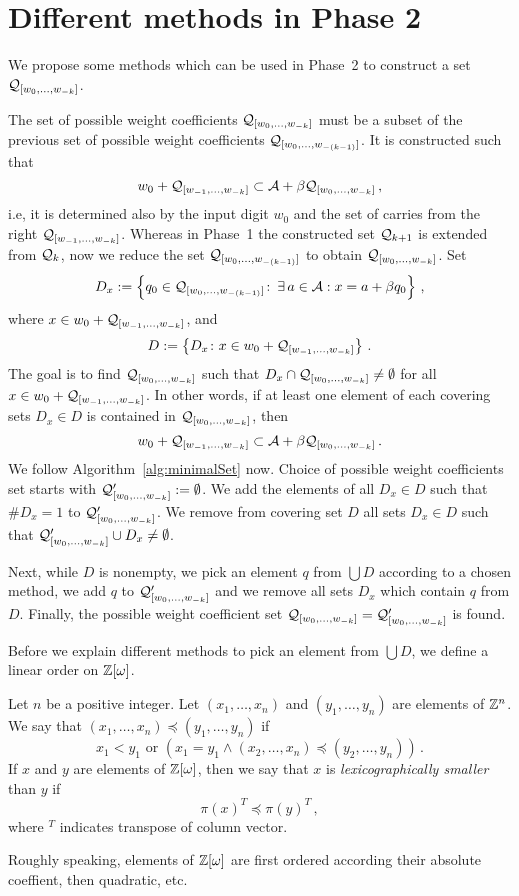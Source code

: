 \section{Different methods in Phase 2}
\label{sec:methodsTwo}
We propose some methods which can be used in Phase~2 to construct a set $\mathcal{Q}_{[w_{0}, \dots, w_{-k}]}$.

The set of possible weight coefficients $\mathcal{Q}_{[w_{0}, \dots, w_{-k}]}$ must be a subset of the previous set of possible weight coefficients $\mathcal{Q}_{[w_{0}, \dots, w_{-(k-1)}]}$. It is constructed such that
$$
 w_0 + \mathcal{Q}_{[w_{-1}, \dots, w_{-k}]} \subset \mathcal{A} + \beta \mathcal{Q}_{[w_{0}, \dots, w_{-k}]}\,,
$$
i.e, it is determined also by the input digit $w_0$ and the set of carries from the right $\mathcal{Q}_{[w_{-1}, \dots, w_{-k}]}$. Whereas in Phase~1 the constructed set $\mathcal{Q}_{k+1}$ is extended from $\mathcal{Q}_k$, now we  reduce the set $\mathcal{Q}_{[w_{0}, \dots, w_{-(k-1)}]}$ to obtain $\mathcal{Q}_{[w_{0}, \dots, w_{-k}]}$. Set 
$$
D_x:= \left\{q_0\in\mathcal{Q}_{[w_{0}, \dots, w_{-(k-1)}]}\colon\, \exists \, a\in\mathcal{A}: x=a+\beta q_0 \right\}\,,
$$
where $x\in w_0 + \mathcal{Q}_{[w_{-1}, \dots, w_{-k}]}$, and 
$$D:=\left\{D_x\colon x\in w_0 + \mathcal{Q}_{[w_{-1}, \dots, w_{-k}]}\right\}\,.$$
 The goal is to find $\mathcal{Q}_{[w_{0}, \dots, w_{-k}]}$ such that $D_x \cap \mathcal{Q}_{[w_{0}, \dots, w_{-k}]} \neq \emptyset$ for all $x\in w_0 + \mathcal{Q}_{[w_{-1}, \dots, w_{-k}]}$. In other words, if at least one element of each covering sets $D_x\in D$ is contained in $\mathcal{Q}_{[w_{0}, \dots, w_{-k}]}$, then 
$$
 w_0 + \mathcal{Q}_{[w_{-1}, \dots, w_{-k}]} \subset \mathcal{A} + \beta \mathcal{Q}_{[w_{0}, \dots, w_{-k}]}\,.
$$
We follow Algorithm~\ref{alg:minimalSet} now. Choice of possible weight coefficients set starts with $\mathcal{Q}_{[w_{0}, \dots, w_{-k}]}':=\emptyset$. We add the elements of all $D_x\in D$ such that $\#D_x=1$ to $\mathcal{Q}_{[w_{0}, \dots, w_{-k}]}'$. We remove from covering set $D$ all sets $D_x\in D$ such that $\mathcal{Q}_{[w_{0}, \dots, w_{-k}]}' \cup D_x \neq \emptyset$. 

Next, while $D$ is nonempty, we pick an element $q$ from $\bigcup D$ according to a chosen method, we add $q$ to $\mathcal{Q}_{[w_{0}, \dots, w_{-k}]}'$ and we remove all sets $D_x$ which contain $q$ from $D$. Finally, the possible weight coefficient set $\mathcal{Q}_{[w_{0}, \dots, w_{-k}]}=\mathcal{Q}_{[w_{0}, \dots, w_{-k}]}'$ is found.

Before we explain different methods  to pick an element from $\bigcup D$, we define a linear order on $\mathbb{Z}[\omega]$.

\begin{defn}
\label{def:lexicographical}
Let $n$ be a positive integer. Let $(x_1, \dots, x_n)$ and $(y_1, \dots, y_n)$ are elements of $\mathbb{Z}^n$. We say that $(x_1, \dots, x_n)\preceq (y_1, \dots, y_n)$ if 
$$
x_1<y_1 \text{ or } \left(x_1=y_1 \wedge (x_2, \dots, x_n)\preceq (y_2, \dots, y_n)\right)\,.
$$
If $x$ and $y$ are elements of $\mathbb{Z}[\omega]$, then we say that $x$ is \emph{lexicographically smaller} than $y$ if
$$
\pi(x)^T \preceq \pi(y)^T\,,
$$
where $^T$ indicates transpose of column vector.
\end{defn}
Roughly speaking, elements of $\mathbb{Z}[\omega]$ are first ordered according their absolute coeffient, then quadratic, etc.

